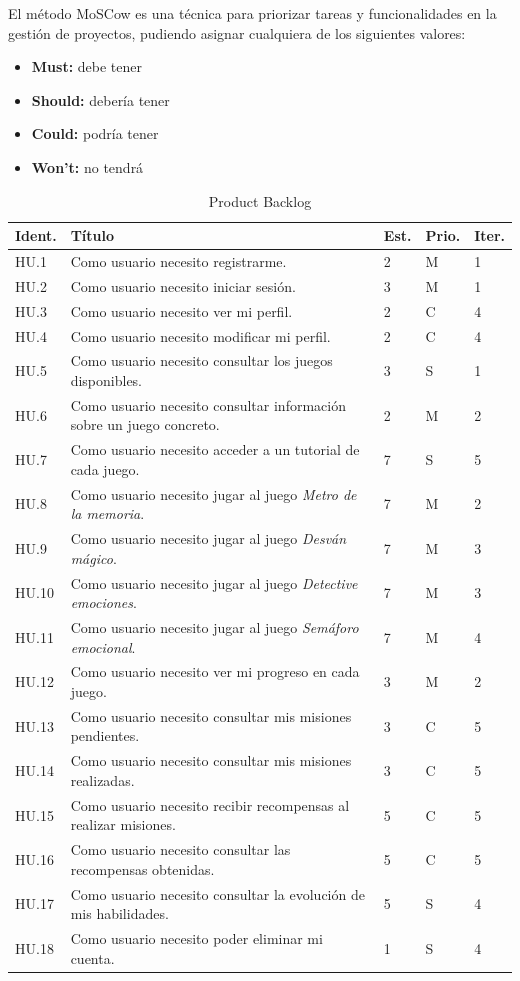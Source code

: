 El método MoSCow es una técnica para priorizar tareas y funcionalidades en la gestión de proyectos, pudiendo asignar cualquiera de los siguientes valores:

\begin{itemize}
    \item \textbf{Must:} debe tener
    \item \textbf{Should:} debería tener
    \item \textbf{Could:} podría tener
    \item \textbf{Won’t:} no tendrá
\end{itemize}

\begin{table}[H]
\centering
\begin{tabularx}{\textwidth}{|X|p{}|X|X|X|}
\hline
\textbf{Ident.} & \textbf{Título} & \textbf{Est.} & \textbf{Prio.} & \textbf{Iter.} \\
\hline
HU.1 & Como usuario necesito registrarme. & 2 & M & 1 \\
\hline
HU.2 & Como usuario necesito iniciar sesión. & 3 & M & 1 \\
\hline
HU.3 & Como usuario necesito ver mi perfil. & 2 & C & 4 \\
\hline
HU.4 & Como usuario necesito modificar mi perfil. & 2 & C & 4 \\
\hline
HU.5 & Como usuario necesito consultar los juegos disponibles. & 3 & S & 1 \\
\hline
HU.6 & Como usuario necesito consultar información sobre un juego concreto. & 2 & M & 2 \\
\hline
HU.7 & Como usuario necesito acceder a un tutorial de cada juego. & 7 & S & 5 \\
\hline
HU.8 & Como usuario necesito jugar al juego \textit{Metro de la memoria}. & 7 & M & 2 \\
\hline
HU.9 & Como usuario necesito jugar al juego \textit{Desván mágico}. & 7 & M & 3 \\
\hline
HU.10 & Como usuario necesito jugar al juego \textit{Detective emociones}. & 7 & M & 3 \\
\hline
HU.11 & Como usuario necesito jugar al juego \textit{Semáforo emocional}. & 7 & M & 4 \\
\hline
HU.12 & Como usuario necesito ver mi progreso en cada juego. & 3 & M & 2 \\
\hline
HU.13 & Como usuario necesito consultar mis misiones pendientes. & 3 & C & 5 \\
\hline
HU.14 & Como usuario necesito consultar mis misiones realizadas. & 3 & C & 5 \\
\hline
HU.15 & Como usuario necesito recibir recompensas al realizar misiones. & 5 & C & 5 \\
\hline
HU.16 & Como usuario necesito consultar las recompensas obtenidas. & 5 & C & 5 \\
\hline
HU.17 & Como usuario necesito consultar la evolución de mis habilidades. & 5 & S & 4 \\
\hline
HU.18 & Como usuario necesito poder eliminar mi cuenta. & 1 & S & 4 \\
\hline
\end{tabularx}
\caption{Product Backlog}
\label{tab:productbacklog}
\end{table}
